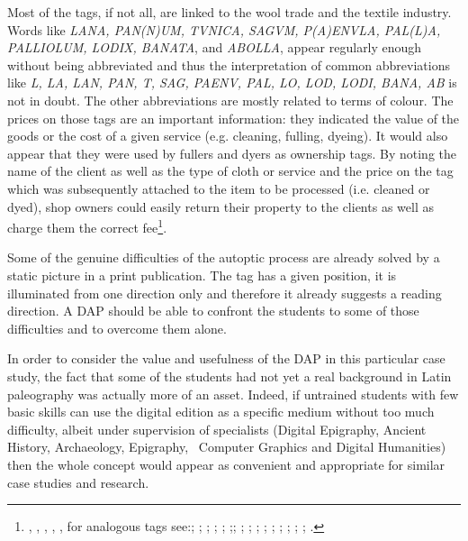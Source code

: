 \documentclass[amsthm,ebook]{saparticle}
\begin{document}
Most of the tags, if not all, are linked to the wool trade and the textile industry. Words like \emph{LANA, PAN(N)UM, TVNICA, SAGVM, P(A)ENVLA, PAL(L)A, PALLIOLUM, LODIX, BANATA}, and \emph{ABOLLA}, appear regularly enough without being abbreviated and
thus the interpretation of common abbreviations like \emph{L, LA, LAN, PAN, T, SAG, PAENV, PAL, LO, LOD, LODI, BANA, AB} is
not in doubt. The other abbreviations are mostly related to terms of colour. The prices on those tags are an important
information: they indicated the value of the goods or the cost of a given service (e.g. cleaning, fulling, dyeing). It
would also appear that they were used by fullers and dyers as ownership tags. By noting the name of the client as well
as the type of cloth or service and the price on the tag which was subsequently attached to the item to be processed
(i.e. cleaned or dyed), shop owners could easily return their property to the clients as well as charge them the
correct fee\footnote{\citet{radman_livaja_segestica_2007}, \citet{radman-livaja_roetiquettes_2010}, \citet{radman-livaja_5_2013}, \citet[165-172]{radman-livaja_two_2013}, \citet{radman-livaja_plombs_2014}, for analogous tags see:\citet[97-104]{mocsy_olom_1956}; \citet[195-210]{egger_funf_1968}; \citet[127-138]{frei-stolba_les_1984}; \citet[331-334]{frei-stolba_les_2011}; \citet[121-137]{schwinden_romerzeitliche_1985}; \citet[215-222]{schwinden_zwei_1993};\citet{romer-martijnse_romerzeitliche_1990}; \citet[5-48]{romer-martijnse_fruhkaiserzeitliche_1997}; \citet[301-305]{feugere_etiquette_1993}; \citet[211-220]{weiss_bleietiketten_1991}; \citet[29-40]{paci_etichette_1995}; \citet[207-216]{bassi_tre_1996}; \citet[121-135]{bizzarini_quattro_2005}; \citet[43-51]{buchi_etichette_2005}; \citet[42-110]{cresci_supellex_2010}; \citet[295-317]{jacques_artisanat_2010}; \citet[237-246]{wedenig_bleietikett_2013}.}. 

Some of the genuine difficulties of the autoptic process are already solved by a static picture in a print publication.
The tag has a given position, it is illuminated from one direction only and therefore it already suggests a reading
direction. A DAP should be able to confront the students to some of those difficulties and to overcome them alone.

In order to consider the value and usefulness of the DAP in this particular case study, the fact that some of the
students had not yet a real background in Latin paleography was actually more of an asset. Indeed, if untrained
students with few basic skills can use the digital edition as a specific medium without too much difficulty, albeit
under supervision of specialists (Digital Epigraphy, Ancient History, Archaeology, Epigraphy, \ Computer Graphics and
Digital Humanities) then the whole concept would appear as convenient and appropriate for similar case studies and
research. 
\end{document}
